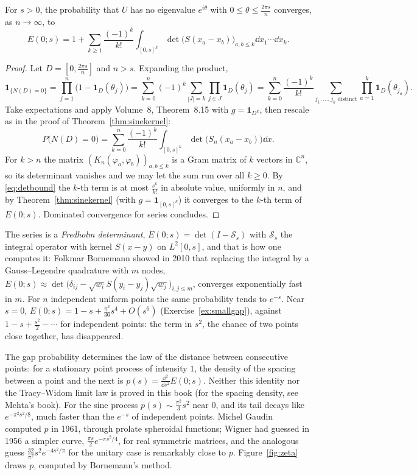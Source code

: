 \begin{theorem}\label{thm:gap}
For $s>0$, the probability that $U$ has no eigenvalue $e^{i\theta}$ with $0\le\theta\le\frac{2\pi s}n$ converges, as $n\to\infty$, to
\[
E(0;s)=1+\sum_{k\ge1}\frac{(-1)^k}{k!}\int_{[0,s]^k}\det\bigl(S(x_a-x_b)\bigr)_{a,b\le k}\dd x_1\cdots\dd x_k.
\]
\end{theorem}

\begin{proof}
Let $D=[0,\frac{2\pi s}n]$ and $n>s$. Expanding the product,
\[
\mathbf 1_{\{N(D)=0\}}=\prod_{j=1}^n\bigl(1-\mathbf 1_D(\theta_j)\bigr)=\sum_{k=0}^n(-1)^k\!\!\sum_{|J|=k}\prod_{j\in J}\mathbf 1_D(\theta_j)=\sum_{k=0}^n\frac{(-1)^k}{k!}\sum_{j_1,\dots,j_k\text{ distinct}}\prod_{a=1}^k\mathbf 1_D(\theta_{j_a}).
\]
Take expectations and apply Volume~8, Theorem~8.15 with $g=\mathbf 1_{D^k}$, then rescale as in the proof of Theorem~\ref{thm:sinekernel}:
\[
P\bigl(N(D)=0\bigr)=\sum_{k=0}^n\frac{(-1)^k}{k!}\int_{[0,s]^k}\det\bigl(S_n(x_a-x_b)\bigr)\dd x.
\]
For $k>n$ the matrix $(K_n(\varphi_a,\varphi_b))_{a,b\le k}$ is a Gram matrix of $k$ vectors in $\mathbb C^n$, so its determinant vanishes and we may let the sum run over all $k\ge0$. By \eqref{eq:detbound} the $k$-th term is at most $\frac{s^k}{k!}$ in
absolute value, uniformly in $n$, and by Theorem~\ref{thm:sinekernel} (with $g=\mathbf 1_{[0,s]^k}$) it converges to the $k$-th term of $E(0;s)$. Dominated convergence for series concludes.
\end{proof}

The series is a \emph{Fredholm determinant}, $E(0;s)=\det(I-\mathcal S_s)$ with $\mathcal S_s$ the integral operator with kernel $S(x-y)$ on $L^2[0,s]$, and that is how one computes it: Folkmar Bornemann showed in 2010 that replacing the integral
by a Gauss--Legendre quadrature with $m$ nodes, $E(0;s)\approx\det\bigl(\delta_{ij}-\sqrt{w_i}S(y_i-y_j)\sqrt{w_j}\bigr)_{i,j\le m}$, converges exponentially fast in $m$. For $n$ independent uniform points the same probability tends to $e^{-s}$.
Near $s=0$, $E(0;s)=1-s+\frac{\pi^2}{36}s^4+O(s^6)$ (Exercise~\ref{ex:smallgap}), against $1-s+\frac{s^2}2-\cdots$ for independent points: the term in $s^2$, the chance of two points close together, has disappeared.

\begin{remark}[spacings]
The gap probability determines the law of the distance between consecutive points: for a stationary point process of intensity $1$, the density of the spacing between a point and the next is $p(s)=\frac{\dd^2}{\dd s^2}E(0;s)$. Neither this identity nor the Tracy--Widom limit law is proved in this book (for the spacing density, see Mehta's book). For the sine process $p(s)\sim\frac{\pi^2}3s^2$ near $0$, and its tail decays like $e^{-\pi^2s^2/8}$, much faster than the $e^{-s}$ of independent points. Michel Gaudin computed $p$ in 1961, through
prolate spheroidal functions; Wigner had guessed in 1956 a simpler curve, $\frac{\pi s}2e^{-\pi s^2/4}$, for real symmetric matrices, and the analogous guess $\frac{32}{\pi^2}s^2e^{-4s^2/\pi}$ for the unitary case is remarkably close to $p$.
Figure~\ref{fig:zeta} draws $p$, computed by Bornemann's method.
\end{remark}

